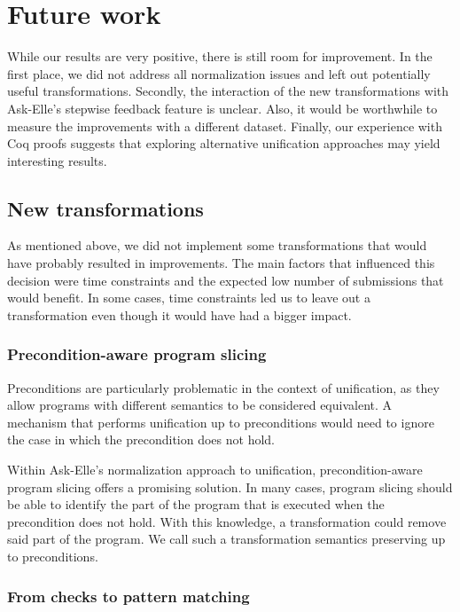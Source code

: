 \section{Future work}
\label{sec:conclusion-future}

While our results are very positive, there is still room for improvement. In the first place, we did not address all normalization issues and left out potentially useful transformations. Secondly, the interaction of the new transformations with Ask-Elle's stepwise feedback feature is unclear. Also, it would be worthwhile to measure the improvements with a different dataset. Finally, our experience with Coq proofs suggests that exploring alternative unification approaches may yield interesting results.

\subsection{New transformations}

As mentioned above, we did not implement some transformations that would have probably resulted in improvements. The main factors that influenced this decision were time constraints and the expected low number of submissions that would benefit. In some cases, time constraints led us to leave out a transformation even though it would have had a bigger impact.

\subsubsection{Precondition-aware program slicing}
\label{sec:discussion-preconditions}

Preconditions are particularly problematic in the context of unification, as they allow programs with different semantics to be considered equivalent. A mechanism that performs unification up to preconditions would need to ignore the case in which the precondition does not hold.

Within Ask-Elle's normalization approach to unification, precondition-aware program slicing offers a promising solution. In many cases, program slicing should be able to identify the part of the program that is executed when the precondition does not hold. With this knowledge, a transformation could remove said part of the program. We call such a transformation semantics preserving up to preconditions.

\subsubsection{From checks to pattern matching}

